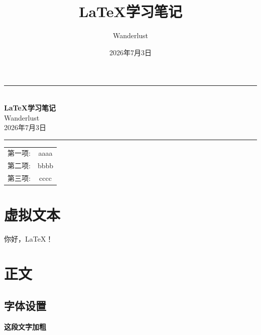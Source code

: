 \documentclass[draft,14pt]{extarticle}%
\title{LaTeX学习笔记}
\author{Wanderlust}
\date{2026年7月3日}
\begin{document}
\maketitle\thispagestyle{fancy}%
\newpage
\begin{titlepage} %
    \vspace*{1.5cm}%
    \begin{center}%
        \rule{0.8\textwidth}{0.4pt}\\[1.5cm]%
        {\Huge \textbf{LaTeX学习笔记}} \\[1.2cm]
        {\Large Wanderlust} \\[0.5cm]
        {\large 2026年7月3日}\\[1.0cm]
        \rule{0.8\textwidth}{0.4pt}%
    \end{center}
    \vspace{1.5cm}
    \begin{tabular}{cc}
        \hspace{2cm} 第一项: & aaaa \\[5pt]
        \hspace{2cm} 第二项: & bbbb \\[5pt]
        \hspace{2cm} 第三项: & cccc \\[5pt]
    \end{tabular}
\end{titlepage}

\newpage%
\tableofcontents%

\newpage%
\section{虚拟文本}
\lipsum[1-3]%
你好，LaTeX！%


\section{正文}
\subsection{字体设置}%
\textbf{这段文字加粗}
\end{document}
